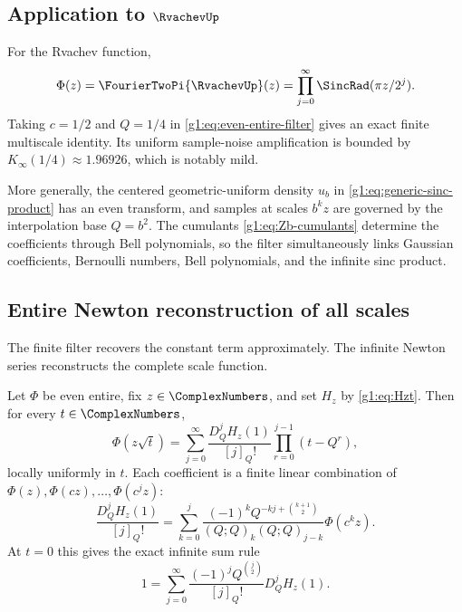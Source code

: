 \subsection{Application to $\RvachevUp$}

For the Rvachev function,
\[
 \Phi(z)=\FourierTwoPi{\RvachevUp}(z)
 =\prod_{j=0}^{\infty}\SincRad(\pi z/2^j).
\]
Taking $c=1/2$ and $Q=1/4$ in
\eqref{g1:eq:even-entire-filter} gives an exact finite multiscale identity.  Its
uniform sample-noise amplification is bounded by
$K_\infty(1/4)\approx1.96926$, which is notably mild.

More generally, the centered geometric-uniform density $u_b$ in
\eqref{g1:eq:generic-sinc-product} has an even transform, and samples at scales
$b^kz$ are governed by the interpolation base $Q=b^2$.  The cumulants
\eqref{g1:eq:Zb-cumulants} determine the coefficients through Bell polynomials,
so the filter simultaneously links Gaussian coefficients, Bernoulli numbers,
Bell polynomials, and the infinite sinc product.

\subsection{Entire Newton reconstruction of all scales}

The finite filter recovers the constant term approximately.  The infinite
Newton series reconstructs the complete scale function.

\begin{theorem}
Let $\Phi$ be even entire, fix $z\in\ComplexNumbers$, and set $H_z$ by
\eqref{g1:eq:Hzt}.  Then for every $t\in\ComplexNumbers$,
\begin{equation}
 \Phi(z\sqrt t)
 =\sum_{j=0}^{\infty}
 \frac{D_Q^jH_z(1)}{[j]_Q!}
 \prod_{r=0}^{j-1}(t-Q^r),
 \label{g1:eq:Phi-scale-Newton}
\end{equation}
locally uniformly in $t$.  Each coefficient is a finite linear combination of
$\Phi(z),\Phi(cz),\ldots,\Phi(c^jz)$:
\begin{equation}
 \frac{D_Q^jH_z(1)}{[j]_Q!}
 =\sum_{k=0}^j
 \frac{(-1)^kQ^{-kj+\binom{k+1}{2}}}
 {(Q;Q)_k(Q;Q)_{j-k}}\Phi(c^kz).
 \label{g1:eq:Phi-scale-coeff}
\end{equation}
At $t=0$ this gives the exact infinite sum rule
\begin{equation}
 1=\sum_{j=0}^{\infty}
 \frac{(-1)^jQ^{\binom j2}}{[j]_Q!}D_Q^jH_z(1).
 \label{g1:eq:Phi-scale-origin}
\end{equation}
\end{theorem}

